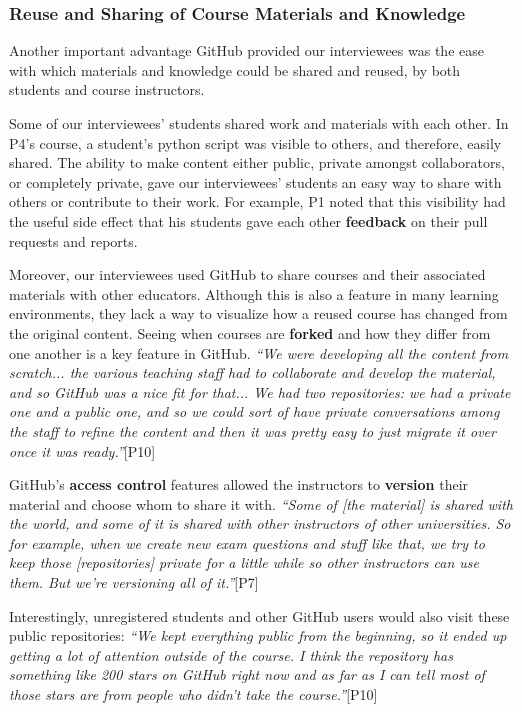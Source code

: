 \subsubsection{Reuse and Sharing of Course Materials and Knowledge}

Another important advantage GitHub provided our interviewees was the ease with which materials and knowledge could be shared and reused, by both students and course instructors.

Some of our interviewees' students shared work and materials with each other. In P4's course, a student's python script was visible to others, and therefore, easily shared. The ability to make content either public, private amongst collaborators, or completely private, gave our interviewees' students an easy way to share with others or contribute to their work. For example, P1 noted that this visibility had the useful side effect that his students gave each other \textbf{feedback} on their pull requests and reports.

Moreover, our interviewees used GitHub to share courses and their associated materials with other educators. Although this is also a feature in many learning environments, they lack a way to visualize how a reused course has changed from the original content. Seeing when courses are \textbf{forked} and how they differ from one another is a key feature in GitHub.
\textit{``We were developing all the content from scratch... the various teaching staff had to collaborate and develop the material, and so GitHub was a nice fit for that... We had two repositories: we had a private one and a public one, and so we could sort of have private conversations among the staff to refine the content and then it was pretty easy to just migrate it over once it was ready.''}[P10]

GitHub's \textbf{access control} features allowed the instructors to \textbf{version} their material and choose whom to share it with. \textit{``Some of [the material] is shared with the world, and some of it is shared with other instructors of other universities. So for example, when we create new exam questions and stuff like that, we try to keep those [repositories] private for a little while so other instructors can use them. But we're versioning all of it.''}[P7]

Interestingly, unregistered students and other GitHub users would also visit these public repositories: \textit{``We kept everything public from the beginning, so it ended up getting a lot of attention outside of the course. I think the repository has something like 200 stars on GitHub right now and as far as I can tell most of those stars are from people who didn't take the course.''}[P10]

